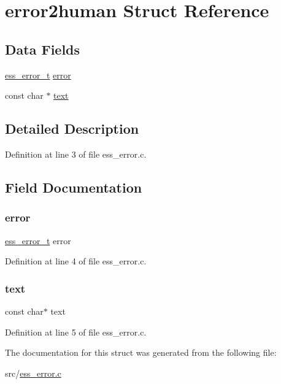 \hypertarget{structerror2human}{}\section{error2human Struct Reference}
\label{structerror2human}
\subsection*{Data Fields}
\begin{DoxyCompactItemize}
\item 
\hyperlink{ess__error_8h_a08ab97fcf6745dee67de912e41bd3236}{ess\+\_\+error\+\_\+t} \hyperlink{structerror2human_a2f8d0c29e46e780a80418ba89448ca5c}{error}
\item 
const char $\ast$ \hyperlink{structerror2human_a16343090e80c4472521560f30113d96c}{text}
\end{DoxyCompactItemize}


\subsection{Detailed Description}


Definition at line 3 of file ess\+\_\+error.\+c.



\subsection{Field Documentation}
\mbox{\label{structerror2human_a2f8d0c29e46e780a80418ba89448ca5c}} 
\subsubsection{\texorpdfstring{error}{error}}
{\footnotesize\ttfamily \hyperlink{ess__error_8h_a08ab97fcf6745dee67de912e41bd3236}{ess\+\_\+error\+\_\+t} error}



Definition at line 4 of file ess\+\_\+error.\+c.

\mbox{\label{structerror2human_a16343090e80c4472521560f30113d96c}} 
\subsubsection{\texorpdfstring{text}{text}}
{\footnotesize\ttfamily const char$\ast$ text}



Definition at line 5 of file ess\+\_\+error.\+c.



The documentation for this struct was generated from the following file\+:\begin{DoxyCompactItemize}
\item 
src/\hyperlink{ess__error_8c}{ess\+\_\+error.\+c}\end{DoxyCompactItemize}
